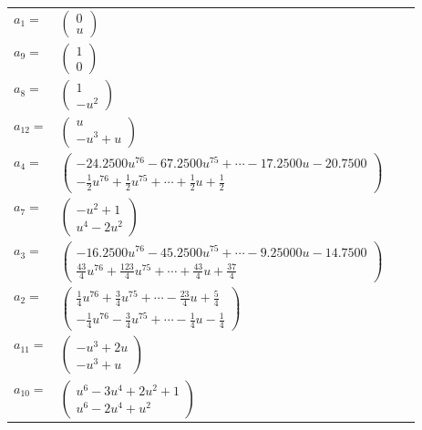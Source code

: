 \documentclass[1p]{elsarticle_modified}
\theoremstyle{definition}
\begin{document}
\begin{tabular}{m{7pt} m{180pt} m{7pt} m{180pt} }
\flushright $a_{1}=$&$\begin{pmatrix}0\\u\end{pmatrix}$ \\
\flushright $a_{9}=$&$\begin{pmatrix}1\\0\end{pmatrix}$ \\
\flushright $a_{8}=$&$\begin{pmatrix}1\\- u^2\end{pmatrix}$ \\
\flushright $a_{12}=$&$\begin{pmatrix}u\\- u^3+u\end{pmatrix}$ \\
\flushright $a_{4}=$&$\begin{pmatrix}-24.2500 u^{76}-67.2500 u^{75}+\cdots-17.2500 u-20.7500\\-\frac{1}{2} u^{76}+\frac{1}{2} u^{75}+\cdots+\frac{1}{2} u+\frac{1}{2}\end{pmatrix}$ \\
\flushright $a_{7}=$&$\begin{pmatrix}- u^2+1\\u^4-2 u^2\end{pmatrix}$ \\
\flushright $a_{3}=$&$\begin{pmatrix}-16.2500 u^{76}-45.2500 u^{75}+\cdots-9.25000 u-14.7500\\\frac{43}{4} u^{76}+\frac{123}{4} u^{75}+\cdots+\frac{43}{4} u+\frac{37}{4}\end{pmatrix}$ \\
\flushright $a_{2}=$&$\begin{pmatrix}\frac{1}{4} u^{76}+\frac{3}{4} u^{75}+\cdots-\frac{23}{4} u+\frac{5}{4}\\-\frac{1}{4} u^{76}-\frac{3}{4} u^{75}+\cdots-\frac{1}{4} u-\frac{1}{4}\end{pmatrix}$ \\
\flushright $a_{11}=$&$\begin{pmatrix}- u^3+2 u\\- u^3+u\end{pmatrix}$ \\
\flushright $a_{10}=$&$\begin{pmatrix}u^6-3 u^4+2 u^2+1\\u^6-2 u^4+u^2\end{pmatrix}$ \\

\end{tabular}
\end{document}
